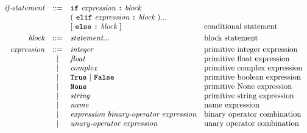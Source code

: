 \[\begin{array}{rcll}
\textit{if-statement}       & ::= & \term{if}\ \textit{expression}\ \term{:}\ \textit{block}                                 &                                         \\
                            &     & (\ \term{elif}\ \textit{expression}\ \term{:}\ \textit{block}\ )...                      &                                         \\
                            &     & [\ \term{else}\ \term{:}\ \textit{block}\ ]                                                    & \text{conditional statement}            \\[1mm]
\textit{block}              & ::= & \textit{statement}...                                                                    & \text{block statement}                  \\[1mm]
\textit{expression}         & ::= & \textit{integer}                                                                         & \text{primitive integer expression}     \\
                            & |   & \textit{float}                                                                           & \text{primitive float expression}       \\
                            & |   & \textit{complex}                                                                         & \text{primitive complex expression}     \\
                            & |   & \term{True}\ |\ \term{False}                                                             & \text{primitive boolean expression}     \\
                            & |   & \term{None}                                                                              & \text{primitive None expression}        \\
                            & |   & \textit{string}                                                                          & \text{primitive string expression}      \\
                            & |   & \textit{name}                                                                            & \text{name expression}                  \\
                            & |   & \textit{expression}\ \textit{binary-operator}\ \textit{expression}                       & \text{binary operator combination}      \\
                            & |   & \textit{unary-operator}\ \textit{expression}                                             & \text{unary operator combination}       \\

\end{array}\]
